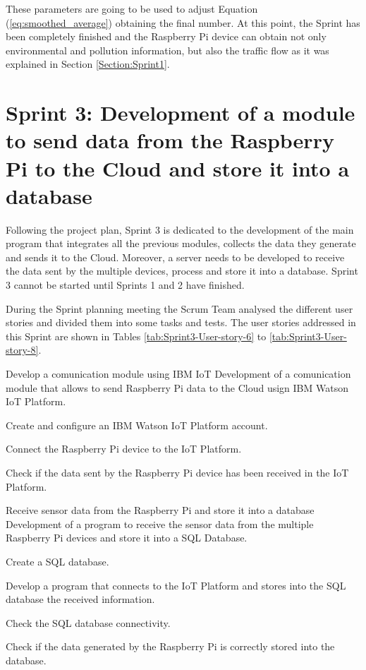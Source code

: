 These parameters are going to be used to adjust Equation (\ref{eq:smoothed_average}) obtaining the final number. At this point, the Sprint has been completely finished and the Raspberry Pi device can obtain not only environmental and pollution information, but also the traffic flow as it was explained in Section \ref{Section:Sprint1}.


\section{Sprint 3: Development of a module to send data from the Raspberry Pi to the Cloud and store it into a database}
Following the project plan, Sprint 3 is dedicated to the development of the main program that integrates all the previous modules, collects the data they generate and sends it to the Cloud. Moreover, a server needs to be developed to receive the data sent by the multiple devices, process and store it into a database. Sprint 3 cannot be started until Sprints 1 and 2 have finished.

During the Sprint planning meeting the Scrum Team analysed the different user stories and divided them into some tasks and tests. The user stories addressed in this Sprint are shown in Tables \ref{tab:Sprint3-User-story-6} to \ref{tab:Sprint3-User-story-8}.

{Develop a comunication module using IBM IoT}
{Development of a comunication module that allows to send Raspberry Pi data to the Cloud usign IBM Watson IoT Platform.}
{	\item Create and configure an IBM Watson IoT Platform account.
	\item Connect the Raspberry Pi device to the IoT Platform.
}{	\item Check if the data sent by the Raspberry Pi device has been received in the IoT Platform.
}

{Receive sensor data from the Raspberry Pi and store it into a database}
{Development of a program to receive the sensor data from the multiple Raspberry Pi devices and store it into a SQL Database.}
{	\item Create a SQL database.
	\item Develop a program that connects to the IoT Platform and stores into the SQL database the received information.
}{	\item Check the SQL database connectivity.
	\item Check if the data generated by the Raspberry Pi is correctly stored into the database.
}

